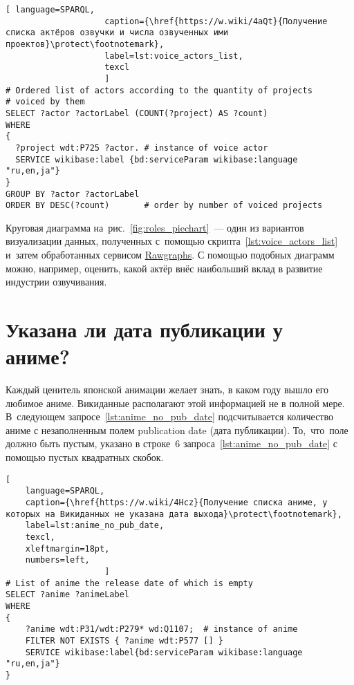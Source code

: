 \begin{lstlisting}[ language=SPARQL, 
                    caption={\href{https://w.wiki/4aQt}{Получение списка актёров озвучки и числа озвученных ими проектов}\protect\footnotemark},
                    label=lst:voice_actors_list,
                    texcl 
                    ]
# Ordered list of actors according to the quantity of projects
# voiced by them
SELECT ?actor ?actorLabel (COUNT(?project) AS ?count)
WHERE
{
  ?project wdt:P725 ?actor.	# instance of voice actor
  SERVICE wikibase:label {bd:serviceParam wikibase:language "ru,en,ja"}
}
GROUP BY ?actor ?actorLabel
ORDER BY DESC(?count)       # order by number of voiced projects
\end{lstlisting}%


Круговая диаграмма 
на~рис.~\ref{fig:roles_piechart}~--- один из вариантов визуализации данных, 
полученных с~помощью скрипта~\ref{lst:voice_actors_list} 
и~затем обработанных сервисом \href{https://app.rawgraphs.io}{Rawgraphs}. 
С помощью подобных диаграмм можно, например, оценить, 
какой актёр внёс наибольший вклад в развитие индустрии озвучивания.



\section{Указана ли дата публикации у аниме?}

Каждый ценитель японской анимации желает знать, 
в каком году вышло его любимое аниме. 
Викиданные располагают этой информацией не в полной мере. 
В~следующем запросе~\ref{lst:anime_no_pub_date} подсчитывается количество аниме с незаполненным полем publication date (дата публикации). 
То,~что~поле должно быть пустым, указано в строке~6 запроса~\ref{lst:anime_no_pub_date} с помощью пустых квадратных скобок.



\newpage
%
%
\lstset{numbers=left, firstnumber=1, frame=single, texcl}
\begin{lstlisting}[ 
    language=SPARQL, 
    caption={\href{https://w.wiki/4Hcz}{Получение списка аниме, у которых на Викиданных не указана дата выхода}\protect\footnotemark},
    label=lst:anime_no_pub_date,
    texcl,
    xleftmargin=18pt, 
    numbers=left,
                    ]
# List of anime the release date of which is empty
SELECT ?anime ?animeLabel
WHERE
{
    ?anime wdt:P31/wdt:P279* wd:Q1107;  # instance of anime
    FILTER NOT EXISTS { ?anime wdt:P577 [] }
    SERVICE wikibase:label{bd:serviceParam wikibase:language "ru,en,ja"}
}
\end{lstlisting}%
\lstset{numbers=none}


